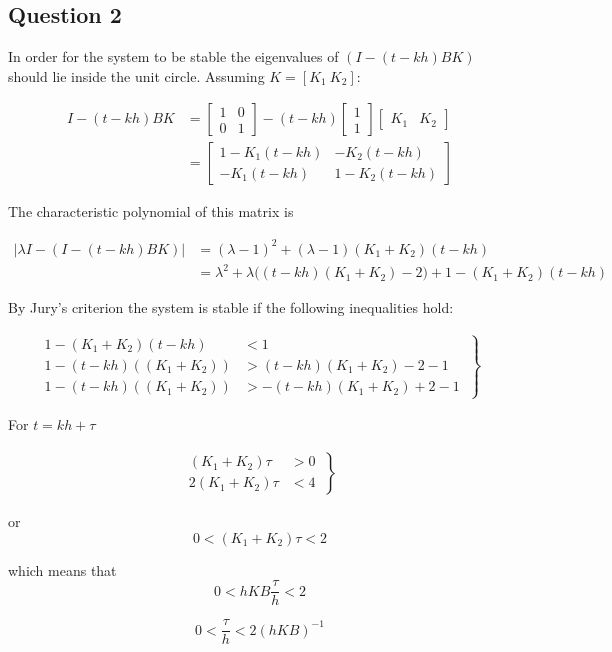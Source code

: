 \subsection{Question 2}

In order for the system to be stable the eigenvalues of $(I - (t-kh)BK)$ should
lie inside the unit circle. Assuming $K = [K_1\ K_2]$:

\begin{align*}
  I - (t-kh)BK &=
  \begin{bmatrix}
    1 & 0 \\
    0 & 1
  \end{bmatrix}
  - (t-kh)
  \begin{bmatrix}
    1 \\
    1
  \end{bmatrix}
  \begin{bmatrix}
    K_1 & K_2
  \end{bmatrix}
  \\
  ~&=
  \begin{bmatrix}
    1 - K_1 (t-kh) & -K_2 (t-kh) \\
    -K_1 (t-kh)    & 1 - K_2 (t-kh)
  \end{bmatrix}
\end{align*}

The characteristic polynomial of this matrix is

\begin{align*}
  |\lambda I - (I - (t-kh)BK)| &= (\lambda-1)^2 + (\lambda-1)(K_1 + K_2)(t-kh) \\
                               &= \lambda^2 + \lambda\big((t-kh)(K_1 + K_2)-2\big) + 1 - (K_1 + K_2)(t-kh)
\end{align*}

By Jury's criterion the system is stable if the following inequalities hold:

\begin{align*}
  \left.\begin{aligned}
    1 - (K_1 + K_2)(t-kh)   &< 1 \\
    1 - (t-kh)((K_1 + K_2)) &> (t-kh)(K_1 + K_2) -2 -1 \\
    1 - (t-kh)((K_1 + K_2)) &> -(t-kh)(K_1 + K_2) +2 -1
  \end{aligned}\ \right\}
\end{align*}

For $t = kh + \tau$

\begin{align*}
  \left.\begin{aligned}
    (K_1 + K_2) \tau &> 0 \\
    2 (K_1 + K_2) \tau &< 4
  \end{aligned}\ \right\}
\end{align*}

or $$0 < (K_1 + K_2) \tau < 2$$

which means that
$$0 < h K B \dfrac{\tau}{h} < 2$$

\begin{equation}
  0 < \dfrac{\tau}{h} < 2(hKB)^{-1}
  \label{eq:03.2}
\end{equation}
